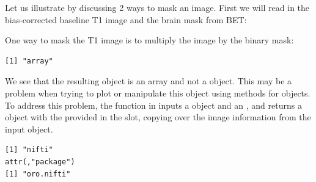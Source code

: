 Let us illustrate by discussing 2 ways to mask an image.  First we will read in the bias-corrected baseline T1 image and the brain mask from BET:


\begin{knitrout}
\color{fgcolor}\begin{kframe}
\begin{alltt}
 \hlkwb{=} \hlstd{(}\hlstd{,} \hlstd{=}\hlstd{)}
 \hlkwb{=} \hlstd{(}\hlstd{,} \hlstd{=}\hlstd{)}
\end{alltt}
\end{kframe}
\end{knitrout}

One way to mask the T1 image is to multiply the image by the binary mask:
\begin{knitrout}
\color{fgcolor}\begin{kframe}
\begin{alltt}
 \hlkwb{=}  \hlopt{*} 
\end{alltt}
\begin{verbatim}
[1] "array"
\end{verbatim}
\end{kframe}
\end{knitrout}

We see that the resulting object is an array and not a  object. This may be a problem when trying to plot or manipulate this object using methods for  objects.  To address this problem, the  function in  inputs a  object and an , and returns a  object with the provided  in the  slot, copying over the image information from the input  object.  

\begin{knitrout}
\color{fgcolor}\begin{kframe}
\begin{alltt}
 \hlkwb{=} 
\end{alltt}
\begin{verbatim}
[1] "nifti"
attr(,"package")
[1] "oro.nifti"
\end{verbatim}
\end{kframe}
\end{knitrout}

